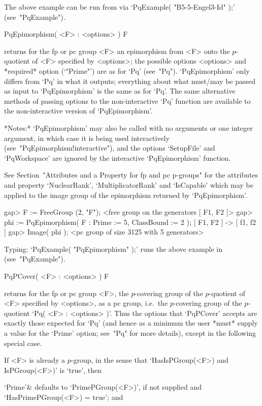 The above example can be run from {\GAP} via `PqExample( "B5-5-Engel3-Id"
);' (see~"PqExample").

\>PqEpimorphism( <F> : <options> ) F

returns for the fp or pc group <F>  an  epimorphism  from  <F>  onto  the
$p$-quotient  of  <F>  specified  by  <options>;  the  possible   options
<options> and *required* option (`"Prime"') are as for  `Pq'  (see~"Pq").
`PqEpimorphism' only differs from `Pq' in  what  it  outputs;  everything
about what must/may be passed as input to `PqEpimorphism' is the same  as
for `Pq'.  The  same  alternative  methods  of  passing  options  to  the
non-interactive  `Pq'  function  are  available  to  the  non-interactive
version of `PqEpimorphism'.

*Notes:* `PqEpimorphism' may also be called  with  no  arguments  or  one
integer  argument,  in  which  case  it  is  being   used   interactively
(see~"PqEpimorphism!interactive"),  and  the  options   `SetupFile'   and
`PqWorkspace' are ignored by the interactive `PqEpimorphism' function.

See Section~"Attributes and a Property for fp and pc  p-groups"  for  the
attributes   and   property   `NuclearRank',   `MultiplicatorRank'    and
`IsCapable' which may be applied to the image group  of  the  epimorphism
returned by `PqEpimorphism'.

\beginexample
gap> F := FreeGroup (2, "F");
<free group on the generators [ F1, F2 ]>
gap> phi := PqEpimorphism( F : Prime := 5, ClassBound := 2 );
[ F1, F2 ] -> [ f1, f2 ]
gap> Image( phi );
<pc group of size 3125 with 5 generators>
\endexample

Typing: `PqExample( "PqEpimorphism" );' runs the above example in  {\GAP}
(see~"PqExample").

\>PqPCover( <F> : <options> ) F

returns for the fp or  pc  group  <F>,  the  $p$-covering  group  of  the
$p$-quotient of <F> specified by  <options>,  as  a  pc  group,  i.e.~the
$p$-covering group of the $p$-quotient `Pq( <F> : <options> )'. Thus  the
options that `PqPCover' accepts are exactly those expected for `Pq'  (and
hence as a minimum the user *must* supply a value for the `Prime' option;
see~"Pq" for more details), except in the following special case.

If <F> is already a $p$-group, in the sense  that  `HasIsPGroup(<F>)  and
IsPGroup(<F>)' is `true', then

\beginitems

`Prime'& 
defaults to `PrimePGroup(<F>)', if not supplied and  `HasPrimePGroup(<F>)
= true'; and


